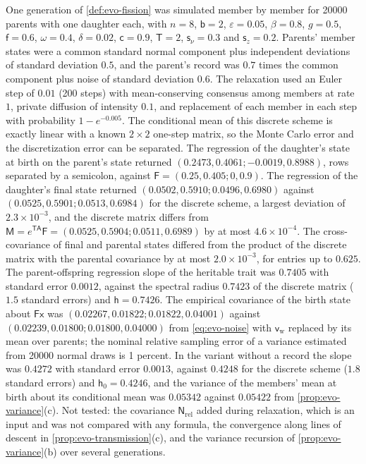 \begin{numcheck}\label{chk:evo-fission}
One generation of \cref{def:evo-fission} was simulated member by member for 20000 parents with one daughter each, with $n=8$, $\mathsf b=2$, $\varepsilon=0.05$, $\beta=0.8$, $g=0.5$, $\mathsf f=0.6$, $\omega=0.4$, $\delta=0.02$, $\mathsf c=0.9$, $\mathsf T=2$, $\mathsf s_\nu=0.3$ and $\mathsf s_z=0.2$. Parents' member states were a common standard normal component plus independent deviations of standard deviation $0.5$, and the parent's record was $0.7$ times the common component plus noise of standard deviation $0.6$. The relaxation used an Euler step of $0.01$ (200 steps) with mean-conserving consensus among members at rate $1$, private diffusion of intensity $0.1$, and replacement of each member in each step with probability $1-e^{-0.005}$. The conditional mean of this discrete scheme is exactly linear with a known $2\times2$ one-step matrix, so the Monte Carlo error and the discretization error can be separated. The regression of the daughter's state at birth on the parent's state returned $(0.2473,0.4061;-0.0019,0.8988)$, rows separated by a semicolon, against $\mathsf F=(0.25,0.405;0,0.9)$. The regression of the daughter's final state returned $(0.0502,0.5910;0.0496,0.6980)$ against $(0.0525,0.5901;0.0513,0.6984)$ for the discrete scheme, a largest deviation of $2.3\times10^{-3}$, and the discrete matrix differs from $\mathsf M=e^{\mathsf T\mathsf A}\mathsf F=(0.0525,0.5904;0.0511,0.6989)$ by at most $4.6\times10^{-4}$. The cross-covariance of final and parental states differed from the product of the discrete matrix with the parental covariance by at most $2.0\times10^{-3}$, for entries up to $0.625$. The parent-offspring regression slope of the heritable trait was $0.7405$ with standard error $0.0012$, against the spectral radius $0.7423$ of the discrete matrix ($1.5$ standard errors) and $\mathsf h=0.7426$. The empirical covariance of the birth state about $\mathsf F\mathsf x$ was $(0.02267,0.01822;0.01822,0.04001)$ against $(0.02239,0.01800;0.01800,0.04000)$ from \eqref{eq:evo-noise} with $\mathsf v_{\mathrm w}$ replaced by its mean over parents; the nominal relative sampling error of a variance estimated from 20000 normal draws is 1 percent. In the variant without a record the slope was $0.4272$ with standard error $0.0013$, against $0.4248$ for the discrete scheme ($1.8$ standard errors) and $\mathsf h_0=0.4246$, and the variance of the members' mean at birth about its conditional mean was $0.05342$ against $0.05422$ from \cref{prop:evo-variance}(c). Not tested: the covariance $\mathsf N_{\mathrm{rel}}$ added during relaxation, which is an input and was not compared with any formula, the convergence along lines of descent in \cref{prop:evo-transmission}(c), and the variance recursion of \cref{prop:evo-variance}(b) over several generations.
\end{numcheck}

